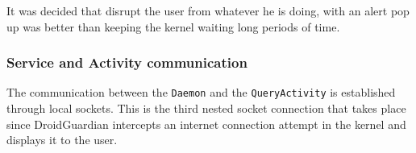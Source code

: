 It was decided that disrupt the user from whatever he is doing, with an alert pop up was better than keeping the kernel waiting long periods of time.

\subsubsection{Service and Activity communication}

The communication between the \texttt{Daemon} and the \texttt{QueryActivity} is established through local sockets. This is the third nested socket connection that takes place since DroidGuardian intercepts an internet connection attempt in the kernel and displays it to the user.


